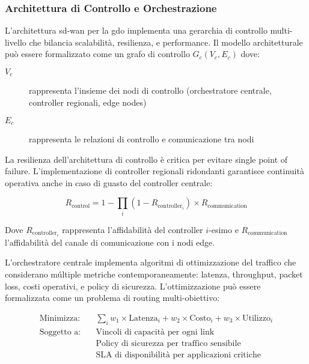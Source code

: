 \subsubsection{Architettura di Controllo e Orchestrazione}

L'architettura \gls{sd-wan} per la \gls{gdo} implementa una gerarchia di controllo multi-livello che bilancia scalabilità, resilienza, e performance. Il modello architetturale può essere formalizzato come un grafo di controllo $G_c(V_c, E_c)$ dove:

\begin{description}
    \item[$V_c$] rappresenta l'insieme dei nodi di controllo (orchestratore centrale, controller regionali, edge nodes)
    \item[$E_c$] rappresenta le relazioni di controllo e comunicazione tra nodi
\end{description}

La resilienza dell'architettura di controllo è critica per evitare single point of failure. L'implementazione di controller regionali ridondanti garantisce continuità operativa anche in caso di guasto del controller centrale:

\begin{equation}
R_{\text{control}} = 1 - \prod_{i} (1 - R_{\text{controller}_i}) \times R_{\text{communication}}
\label{eq:resilienza-controllo}
\end{equation}

Dove $R_{\text{controller}_i}$ rappresenta l'affidabilità del controller $i$-esimo e $R_{\text{communication}}$ l'affidabilità del canale di comunicazione con i nodi edge.

L'orchestratore centrale implementa algoritmi di ottimizzazione del traffico che considerano múltiple metriche contemporaneamente: latenza, throughput, packet loss, costi operativi, e policy di sicurezza. L'ottimizzazione può essere formalizzata come un problema di routing multi-obiettivo:

\begin{align}
\text{Minimizza:} \quad & \sum_{i} w_1 \times \text{Latenza}_i + w_2 \times \text{Costo}_i + w_3 \times \text{Utilizzo}_i \label{eq:ottimizzazione-obiettivo} \\
\text{Soggetto a:} \quad & \text{Vincoli di capacità per ogni link} \nonumber \\
& \text{Policy di sicurezza per traffico sensibile} \nonumber \\
& \text{SLA di disponibilità per applicazioni critiche} \nonumber
\end{align}

